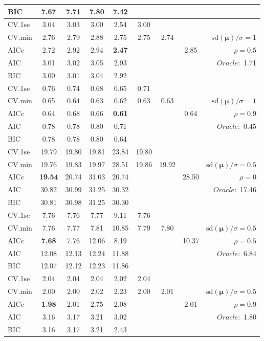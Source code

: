 \begin{table}
\begin{center}
\begin{tabular}{l*{7}{c}|r}
BIC & 7.67 & 7.71 & 7.80 & 7.42 & & & &  \\
 \hline 
CV.1se & 3.04 & 3.03 & 3.00 & 2.54 & 3.00 & & & \\
CV.min & 2.76 & 2.79 & 2.88 & 2.75 & 2.75 & 2.74 & & $\mathrm{sd}(\mathbf{\mu})/\sigma=1$ \\
AICc & 2.72 & 2.92 & 2.94 & {\bf 2.47} & & & 2.85 &  $\rho=0.5$ \\
AIC & 3.01 & 3.02 & 3.05 & 2.93 & & & &  \multirow{2}{*}{$Oracle: $ 1.71} \\
BIC & 3.00 & 3.01 & 3.04 & 2.92 & & & &  \\
 \hline 
CV.1se & 0.76 & 0.74 & 0.68 & 0.65 & 0.71 & & & \\
CV.min & 0.65 & 0.64 & 0.63 & 0.62 & 0.63 & 0.63 & & $\mathrm{sd}(\mathbf{\mu})/\sigma=1$ \\
AICc & 0.64 & 0.68 & 0.66 & {\bf 0.61} & & & 0.64 &  $\rho=0.9$ \\
AIC & 0.78 & 0.78 & 0.80 & 0.71 & & & &  \multirow{2}{*}{$Oracle: $ 0.45} \\
BIC & 0.78 & 0.78 & 0.80 & 0.64 & & & &  \\
 \hline 
CV.1se & 19.79 & 19.80 & 19.81 & 23.84 & 19.80 & & & \\
CV.min & 19.76 & 19.83 & 19.97 & 28.51 & 19.86 & 19.92 & & $\mathrm{sd}(\mathbf{\mu})/\sigma=0.5$ \\
AICc & {\bf 19.54} & 20.74 & 31.03 & 20.74 & & & 28.50 &  $\rho=0$ \\
AIC & 30.82 & 30.99 & 31.25 & 30.32 & & & &  \multirow{2}{*}{$Oracle: $ 17.46} \\
BIC & 30.81 & 30.98 & 31.25 & 30.30 & & & &  \\
 \hline 
CV.1se & 7.76 & 7.76 & 7.77 & 9.11 & 7.76 & & & \\
CV.min & 7.76 & 7.77 & 7.81 & 10.85 & 7.79 & 7.80 & & $\mathrm{sd}(\mathbf{\mu})/\sigma=0.5$ \\
AICc & {\bf 7.68} & 7.76 & 12.06 & 8.19 & & & 10.37 &  $\rho=0.5$ \\
AIC & 12.08 & 12.13 & 12.24 & 11.88 & & & &  \multirow{2}{*}{$Oracle: $ 6.84} \\
BIC & 12.07 & 12.12 & 12.23 & 11.86 & & & &  \\
 \hline 
CV.1se & 2.04 & 2.04 & 2.04 & 2.02 & 2.04 & & & \\
CV.min & 2.00 & 2.00 & 2.02 & 2.23 & 2.00 & 2.01 & & $\mathrm{sd}(\mathbf{\mu})/\sigma=0.5$ \\
AICc & {\bf 1.98} & 2.01 & 2.75 & 2.08 & & & 2.01 &  $\rho=0.9$ \\
AIC & 3.16 & 3.17 & 3.21 & 3.02 & & & &  \multirow{2}{*}{$Oracle: $ 1.80} \\
BIC & 3.16 & 3.17 & 3.21 & 2.43 & & & &  \\
 \hline 
\end{tabular}
\end{center}
\vspace{-1cm}
\end{table}





